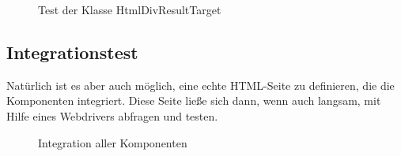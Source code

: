 \begin{figure}[H]
	\begin{center}
		\caption{Test der Klasse HtmlDivResultTarget}
		\label{code:resulttargettest}
	\end{center}
\end{figure}

\subsection{Integrationstest}

Natürlich ist es aber auch möglich, eine echte HTML-Seite zu definieren, die die Komponenten integriert. Diese Seite ließe sich dann, wenn auch langsam, mit Hilfe eines Webdrivers abfragen und testen.

\begin{figure}[H]
	\begin{center}
		\caption{Integration aller Komponenten}
		\label{code:htmlintegration}
	\end{center}
\end{figure}





